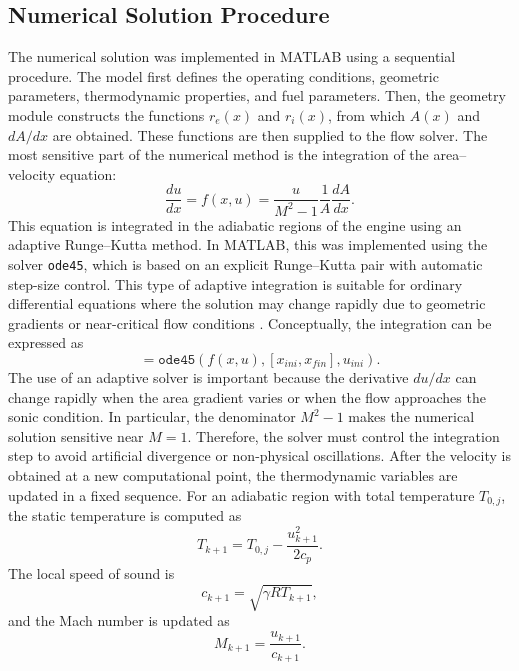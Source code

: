 \documentclass[preprint,12pt]{elsarticle}
\begin{document}
\subsection{Numerical Solution Procedure}
The numerical solution was implemented in MATLAB using a sequential procedure. The model first defines the operating conditions, geometric parameters, thermodynamic properties, and fuel parameters. Then, the geometry module constructs the functions $r_e(x)$ and $r_i(x)$, from which $A(x)$ and $dA/dx$ are obtained. These functions are then supplied to the flow solver.
The most sensitive part of the numerical method is the integration of the area--velocity equation:
\begin{equation}
\frac{du}{dx}
=
f(x,u)
=
\frac{u}{M^2-1}
\frac{1}{A}
\frac{dA}{dx}.
\label{eq:numerical_velocity}
\end{equation}
This equation is integrated in the adiabatic regions of the engine using an adaptive Runge--Kutta method. In MATLAB, this was implemented using the solver \texttt{ode45}, which is based on an explicit Runge--Kutta pair with automatic step-size control. This type of adaptive integration is suitable for ordinary differential equations where the solution may change rapidly due to geometric gradients or near-critical flow conditions \cite{Burden2011}. Conceptually, the integration can be expressed as
\begin{equation}
[x,u]
=
\texttt{ode45}
\left(
f(x,u),[x_{ini},x_{fin}],u_{ini}
\right).
\label{eq:ode45}
\end{equation}
The use of an adaptive solver is important because the derivative $du/dx$ can change rapidly when the area gradient varies or when the flow approaches the sonic condition. In particular, the denominator $M^2-1$ makes the numerical solution sensitive near $M=1$. Therefore, the solver must control the integration step to avoid artificial divergence or non-physical oscillations.
After the velocity is obtained at a new computational point, the thermodynamic variables are updated in a fixed sequence. For an adiabatic region with total temperature $T_{0,j}$, the static temperature is computed as
\begin{equation}
T_{k+1}
=
T_{0,j}
-
\frac{u_{k+1}^{2}}{2c_p}.
\label{eq:temperature_update}
\end{equation}
The local speed of sound is
\begin{equation}
c_{k+1}
=
\sqrt{\gamma R T_{k+1}},
\end{equation}
and the Mach number is updated as
\begin{equation}
M_{k+1}
=
\frac{u_{k+1}}{c_{k+1}}.
\end{equation}
\end{document}
